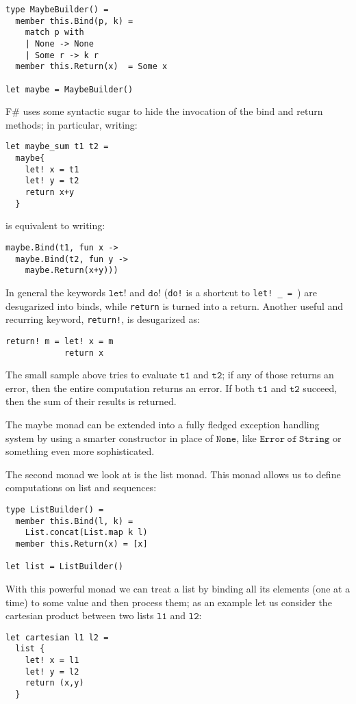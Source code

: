 \begin{lstlisting}
type MaybeBuilder() =
  member this.Bind(p, k) =
    match p with
    | None -> None
    | Some r -> k r
  member this.Return(x)  = Some x

let maybe = MaybeBuilder()
\end{lstlisting}

F\# uses some syntactic sugar to hide the invocation of the bind and
return methods; in particular, writing: 

\medskip
\begin{lstlisting}
let maybe_sum t1 t2 =
  maybe{
    let! x = t1
    let! y = t2
    return x+y
  }
\end{lstlisting}

is equivalent to writing:
\begin{lstlisting}
maybe.Bind(t1, fun x ->
  maybe.Bind(t2, fun y ->
    maybe.Return(x+y)))
\end{lstlisting}

In general the keywords $\mathtt{let!}$ and $\mathtt{do!}$
(\texttt{do!} is a shortcut to \texttt{let! \_ = }) are desugarized
into binds, while \texttt{return} is turned into a return. Another
useful and recurring keyword, \texttt{return!}, is desugarized as: 
\begin{lstlisting}
return! m = let! x = m
            return x
\end{lstlisting}

The small sample above tries to evaluate $\mathtt{t1}$ and
$\mathtt{t2}$; if any of those returns an error, then the entire
computation returns an error. If both $\mathtt{t1}$ and
$\mathtt{t2}$ succeed, then the sum of their results is returned. 

The maybe monad can be extended into a fully fledged exception
handling system by using a smarter constructor in place of 
$\mathtt{None}$, like $\mathtt{Error\ of\ String}$ or something even
more sophisticated.  

The second monad we look at is the list monad. This monad allows us to
define computations on list and sequences: 
\begin{lstlisting}
type ListBuilder() =
  member this.Bind(l, k) = 
    List.concat(List.map k l)
  member this.Return(x) = [x]

let list = ListBuilder()
\end{lstlisting}

With this powerful monad we can treat a list by binding all its
elements (one at a time) to some value and then process them; as an
example let us consider the cartesian product between two lists 
$\mathtt{l1}$ and $\mathtt{l2}$: 
\begin{lstlisting}
let cartesian l1 l2 = 
  list { 
    let! x = l1
    let! y = l2
    return (x,y)
  }
\end{lstlisting}

